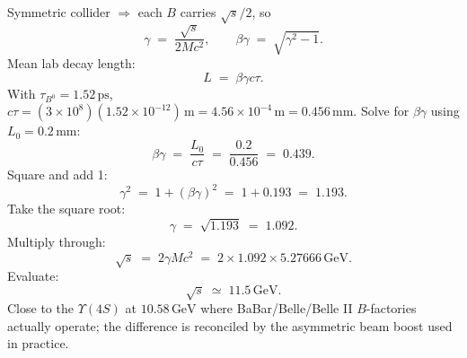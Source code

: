 \documentclass[11pt]{article}
\begin{document}
Symmetric collider $\Rightarrow$ each $B$ carries $\sqrt{s}/2$, so
\[
\gamma\;=\;\frac{\sqrt{s}}{2Mc^{2}},\qquad \beta\gamma\;=\;\sqrt{\gamma^{2}-1}.
\]
Mean lab decay length:
\[
L\;=\;\beta\gamma c\tau.
\]
With $\tau_{B^{0}}=1.52\,\text{ps}$, $c\tau=(3\times 10^{8})(1.52\times 10^{-12})\,\text{m}=4.56\times 10^{-4}\,\text{m}=0.456\,\text{mm}$. Solve for $\beta\gamma$ using $L_0=0.2\,\text{mm}$:
\[
\beta\gamma\;=\;\frac{L_0}{c\tau}\;=\;\frac{0.2}{0.456}\;=\;0.439.
\]
Square and add 1:
\[
\gamma^{2}\;=\;1+(\beta\gamma)^{2}\;=\;1+0.193\;=\;1.193.
\]
Take the square root:
\[
\gamma\;=\;\sqrt{1.193}\;=\;1.092.
\]
Multiply through:
\[
\sqrt{s}\;=\;2\gamma Mc^{2}\;=\;2\times 1.092\times 5.27666\,\text{GeV}.
\]
Evaluate:
\begin{equation}
\boxed{\;\sqrt{s}\;\simeq\;11.5\,\text{GeV}.\;}
\end{equation}
Close to the $\Upsilon(4S)$ at $10.58\,\text{GeV}$ where BaBar/Belle/Belle II $B$-factories actually operate; the difference is reconciled by the asymmetric beam boost used in practice.
\end{document}

